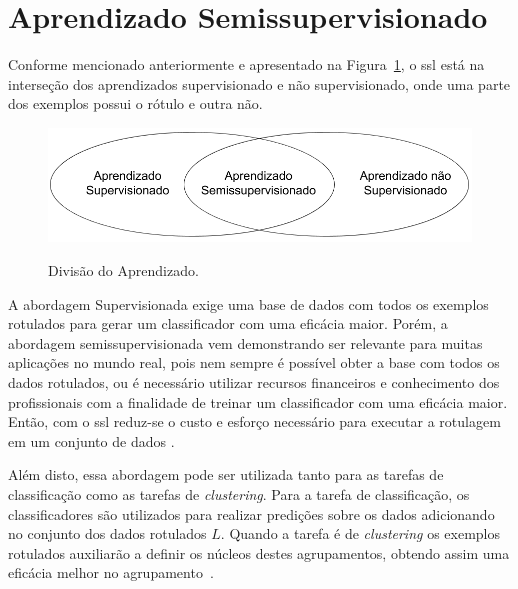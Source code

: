 \section{Aprendizado Semissupervisionado}
    \label{sec:semi-supervised-learning}
    
    
    Conforme mencionado anteriormente e apresentado na Figura~\ref{fig:machine-learning}, o \ac{ssl} está na interseção dos aprendizados supervisionado e não supervisionado, onde uma parte dos exemplos possui o rótulo e outra não.

    \begin{figure}[h]
        \centering
        \caption{Divisão do Aprendizado.}
        \includegraphics[scale = 0.4]{figuras/Aprendizado-de-maquina.png}
        \label{fig:machine-learning}
    \end{figure}
    
    A abordagem Supervisionada exige uma base de dados com todos os exemplos rotulados para gerar um classificador com uma eficácia maior. Porém, a abordagem semissupervisionada vem demonstrando ser relevante para muitas aplicações no mundo real, pois nem sempre é possível obter a base com todos os dados rotulados, ou é necessário utilizar recursos financeiros e conhecimento dos profissionais com a finalidade de treinar um classificador com uma eficácia maior. Então, com o \ac{ssl} reduz\hyp{se} o custo e esforço necessário para executar a rotulagem em um conjunto de dados \cite{bouchachia2012semi, hady2013semi}.
    
    Além disto, essa abordagem pode ser utilizada tanto para as tarefas de classificação como as tarefas de \textit{clustering}. Para a tarefa de classificação, os classificadores são utilizados para realizar predições sobre os dados adicionando no conjunto dos dados rotulados $L$. Quando a tarefa é de \textit{clustering} os exemplos rotulados auxiliarão a definir os núcleos destes agrupamentos, obtendo assim uma eficácia melhor no agrupamento~\cite{chapelle2006semi}.
    
